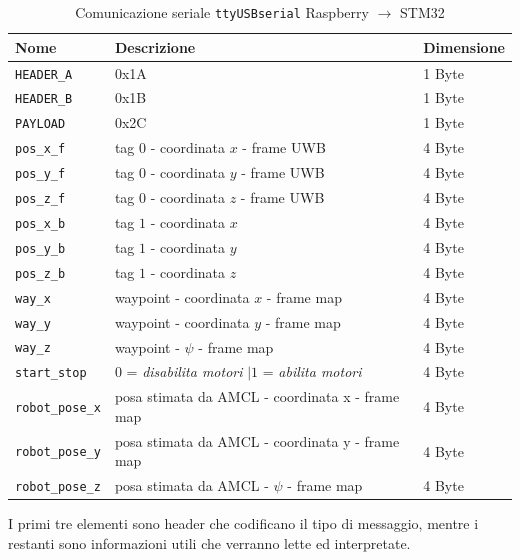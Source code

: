 \begin{table}[h]
		\centering
		\label{tab: comunicazione_seriale2stm}
		\begin{tabular}{lll}
			Nome                 & Descrizione                                & Dimensione\\
			\hline
			\verb!HEADER_A!      & 0x1A                                       & 1 Byte\\
			\verb!HEADER_B!      & 0x1B                                       & 1 Byte\\
			\verb!PAYLOAD!       & 0x2C                                       & 1 Byte\\
			\hline
			\verb!pos_x_f!       & tag $0$ - coordinata $x$ - frame UWB       & 4 Byte\\
			\verb!pos_y_f!       & tag $0$ - coordinata $y$ - frame UWB       & 4 Byte\\
			\verb!pos_z_f!       & tag $0$ - coordinata $z$ - frame UWB       & 4 Byte\\
			\hline
			\verb!pos_x_b!       & tag $1$ - coordinata $x$                   & 4 Byte\\
			\verb!pos_y_b!       & tag $1$ - coordinata $y$                   & 4 Byte\\
			\verb!pos_z_b!       & tag $1$ - coordinata $z$                   & 4 Byte\\
			\hline
			\verb!way_x!         & waypoint - coordinata $x$ - frame map    & 4 Byte\\
			\verb!way_y!         & waypoint - coordinata $y$ - frame map    & 4 Byte\\
			\verb!way_z!         & waypoint - $\psi$  - frame map            & 4 Byte\\
			\hline
			\verb!start_stop!    & $0$ = \textit{disabilita motori} $| 1$ =\textit{ abilita motori }      & 4 Byte\\
			\hline
			\verb!robot_pose_x!  & posa stimata da AMCL - coordinata x - frame map   & 4 Byte\\
			\verb!robot_pose_y!  & posa stimata da AMCL - coordinata y - frame map   & 4 Byte\\
			\verb!robot_pose_z!  & posa stimata da AMCL - $\psi$ - frame map            & 4 Byte\\
		\end{tabular}
		\caption{Comunicazione seriale \texttt{ttyUSBserial} Raspberry $\rightarrow$ STM32}
\end{table}


I primi tre elementi sono header che codificano il tipo di messaggio, mentre i restanti sono informazioni utili che verranno lette ed interpretate. 

